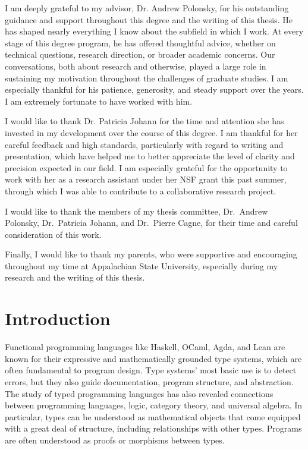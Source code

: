 \documentclass{msthesis}
\theoremstyle{definition}
\begin{document}
\begin{acknowledgements}
I am deeply grateful to my advisor, Dr. Andrew Polonsky, for his outstanding guidance and support throughout this degree and the writing of this thesis.  He has shaped nearly everything I know about the subfield in which I work.  At every stage of this degree program, he has offered thoughtful advice, whether on technical questions, research direction, or broader academic concerns.  Our conversations, both about research and otherwise, played a large role in sustaining my motivation throughout the challenges of graduate studies.  I am especially thankful for his patience, generosity, and steady support over the years.  I am extremely fortunate to have worked with him.

I would like to thank Dr. Patricia Johann for the time and attention she has invested in my development over the course of this degree.  I am thankful for her careful feedback and high standards, particularly with regard to writing and presentation, which have helped me to better appreciate the level of clarity and precision expected in our field.  I am especially grateful for the opportunity to work with her as a research assistant under her NSF grant this past summer, through which I was able to contribute to a collaborative research project.

I would like to thank the members of my thesis committee, Dr.~Andrew Polonsky, Dr.~Patricia Johann, and Dr.~Pierre Cagne, for their time and careful consideration of this work.

Finally, I would like to thank my parents, who were supportive and encouraging throughout my time at Appalachian State University, especially during my research and the writing of this thesis.
\end{acknowledgements}

\tableofcontents
\listoffigures

\chapters

\chapter{Introduction}

Functional programming languages like Haskell, OCaml, Agda, and Lean are known for their expressive and mathematically grounded type systems, which are often fundamental to program design.  Type systems' most basic use is to detect errors, but they also guide documentation, program structure, and abstraction.  The study of typed programming languages has also revealed connections between programming languages, logic, category theory, and universal algebra.  In particular, types can be understood as mathematical objects that come equipped with a great deal of structure, including relationships with other types.  Programs are often understood as proofs or morphisms between types.
\end{document}
